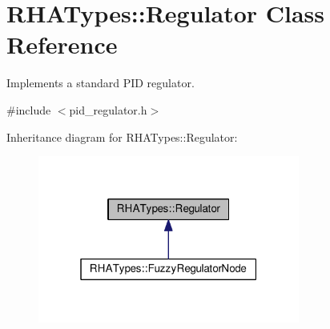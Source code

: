 \hypertarget{classRHATypes_1_1Regulator}{}\section{R\+H\+A\+Types\+:\+:Regulator Class Reference}
\label{classRHATypes_1_1Regulator}


Implements a standard P\+ID regulator.  




{\ttfamily \#include $<$pid\+\_\+regulator.\+h$>$}



Inheritance diagram for R\+H\+A\+Types\+:\+:Regulator\+:
\nopagebreak
\begin{figure}[H]
\begin{center}
\leavevmode
\includegraphics[width=244pt]{classRHATypes_1_1Regulator__inherit__graph}
\end{center}
\end{figure}
